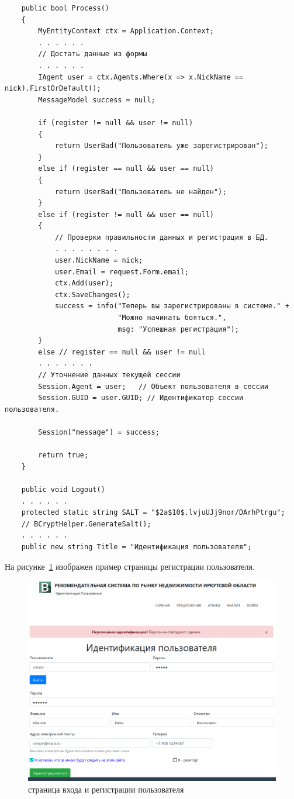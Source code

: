\documentclass[a4paper,14pt,openany,final]{extreport} %
\def\oldcaption{} \let\oldcaption=\caption
\def\caption{\stepcounter{captionsnum}\oldcaption}
\begin{document}
{\begin{verbatim}
    public bool Process()
    {
        MyEntityContext ctx = Application.Context;
        . . . . . .
        // Достать данные из формы
        . . . . . .
        IAgent user = ctx.Agents.Where(x => x.NickName == nick).FirstOrDefault();
        MessageModel success = null;

        if (register != null && user != null)
        {
            return UserBad("Пользователь уже зарегистрирован");
        }
        else if (register == null && user == null)
        {
            return UserBad("Пользователь не найден");
        }
        else if (register != null && user == null)
        {
            // Проверки правильности данных и регистрация в БД.
            . . . . . . . .
            user.NickName = nick;
            user.Email = request.Form.email;
            ctx.Add(user);
            ctx.SaveChanges();
            success = info("Теперь вы зарегистрированы в системе." +
                           "Можно начинать бояться.",
                           msg: "Успешная регистрация");
        }
        else // register == null && user != null
        . . . . . . .
        // Уточнение данных текущей сессии
        Session.Agent = user;   // Объект пользователя в сессии
        Session.GUID = user.GUID; // Идентификатор сессии пользователя.

        Session["message"] = success;

        return true;
    }

    public void Logout()
    . . . . . .
    protected static string SALT = "$2a$10$.lvjuUJj9nor/DArhPtrgu";
    // BCryptHelper.GenerateSalt();
    . . . . . .
    public new string Title = "Идентификация пользователя";
\end{verbatim}

На рисунке~\ref{fig:loginregister} изображен пример страницы регистрации пользователя.

\begin{figure}[htbp]
  \centering
  \includegraphics[width=0.8\linewidth]{screen-login.png}
  \caption{страница входа и регистрации пользователя}
  \label{fig:loginregister}
\end{figure}

}
\end{document}
